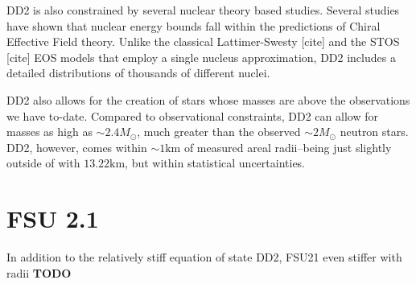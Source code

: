 DD2 is also constrained by several nuclear theory based studies.
Several studies have shown that nuclear energy bounds fall within the predictions of Chiral Effective Field theory.
Unlike the classical Lattimer-Swesty [cite] and the STOS [cite] EOS models that employ a single nucleus approximation, DD2 includes a detailed distributions of thousands of different nuclei.

DD2 also allows for the creation of stars whose masses are above the observations we have to-date.
Compared to observational constraints, DD2 can allow for masses as high as $\sim 2.4 M_\odot$, much greater than the observed $\sim 2 M_\odot$ neutron stars.
DD2, however, comes within $\sim 1 \textrm{km}$ of measured areal radii--being just slightly outside of with $13.22 \textrm{km}$, but within statistical uncertainties.

\section{FSU 2.1}
\label{sec:fsu21}
In addition to the relatively stiff equation of state DD2, FSU21 even stiffer with radii \textbf{TODO}



